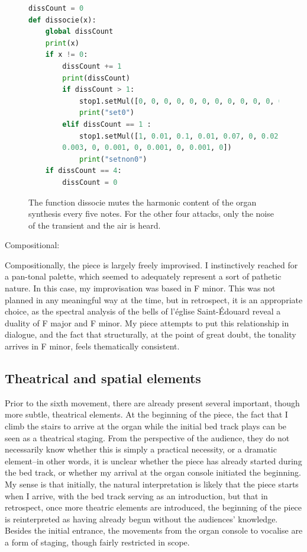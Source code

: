 \documentclass[12pt,twoside,maitrise]{dms_ks}
\theoremstyle{definition}
\begin{document}
{\begin{figure}[H]
\begin{lstlisting}[language=Python]
dissCount = 0
def dissocie(x):
    global dissCount
    print(x)
    if x != 0:
        dissCount += 1
        print(dissCount)
        if dissCount > 1:
            stop1.setMul([0, 0, 0, 0, 0, 0, 0, 0, 0, 0, 0, 0, 0, 0, 0, 0, 0, 0, 0, 0])
            print("set0")
        elif dissCount == 1 :
            stop1.setMul([1, 0.01, 0.1, 0.01, 0.07, 0, 0.02, 0, 0.01, 0, 0.003, 0,
	    0.003, 0, 0.001, 0, 0.001, 0, 0.001, 0])
            print("setnon0")
    if dissCount == 4:
        dissCount = 0
\end{lstlisting}
\caption{The function dissocie mutes the harmonic content of the organ synthesis every five notes.
For the other four attacks, only the noise of the transient and the air is heard.}
\end{figure}

Compositional:

Compositionally, the piece is largely freely improvised.
I instinctively reached for a pan-tonal palette, which seemed to adequately represent a sort of pathetic nature.
In this case, my improvisation was based in F minor.
This was not planned in any meaningful way at the time, but in retrospect, it is an appropriate choice, as the spectral analysis of the bells of l'église Saint-Édouard reveal a duality of F major and F minor.
My piece attempts to put this relationship in dialogue, and the fact that structurally, at the point of great doubt, the tonality arrives in F minor, feels thematically consistent.


\subsection{Theatrical and spatial elements}

Prior to the sixth movement, there are already present several important, though more subtle, theatrical elements.
At the beginning of the piece, the fact that I climb the stairs to arrive at the organ while the initial bed track plays can be seen as a theatrical staging.
From the perspective of the audience, they do not necessarily know whether this is simply a practical necessity, or a dramatic element--in other words, it is unclear whether the piece has already started during the bed track, or whether my arrival at the organ console initiated the beginning.
My sense is that initially, the natural interpretation is likely that the piece starts when I arrive, with the bed track serving as an introduction, but that in retrospect, once more theatric elements are introduced, the beginning of the piece is reinterpreted as having already begun without the audiences' knowledge.
Besides the initial entrance, the movements from the organ console to vocalise are a form of staging, though fairly restricted in scope.

}
\end{document}
